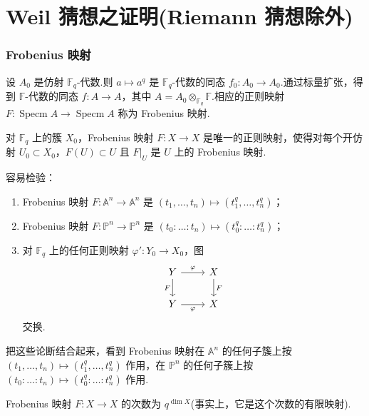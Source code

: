 ﻿%
\chapter{Weil 猜想之证明(Riemann 猜想除外)}\label{sec:27}

\subsection*{Frobenius 映射}

设 $A_0$ 是仿射 $\mathbb{F}_q$-代数.则 $a \mapsto a^{q}$ 是 $\mathbb{F}_q$-代数的同态 $f_0 \colon A_0 \to A_0$.通过标量扩张，得到 $\mathbb{F}$-代数的同态 $f \colon A \to A$，其中 $A = A_0 \otimes_{\mathbb{F}_q} \mathbb{F}$.相应的正则映射 $F \colon \operatorname{Specm} A \to \operatorname{Specm} A$ 称为 Frobenius 映射.

对 $\mathbb{F}_q$ 上的簇 $X_0$，Frobenius 映射 $F \colon X \to X$ 是唯一的正则映射，使得对每个开仿射 $U_0 \subset X_0$，$F(U) \subset U$ 且 $F|_{U}$ 是 $U$ 上的 Frobenius 映射.

容易检验：
\begin{enumerate}
  \item Frobenius 映射 $F \colon \mathbb{A}^{n} \to \mathbb{A}^{n}$ 是 $(t_1, \ldots, t_n) \mapsto (t^{q}_1, \ldots, t^{q}_n)$；
  \item Frobenius 映射 $F \colon \mathbb{P}^{n} \to \mathbb{P}^{n}$ 是 $(t_0 \colon \ldots \colon t_n) \mapsto (t^{q}_0 \colon \ldots \colon t^{q}_n)$；
  \item 对 $\mathbb{F}_q$ 上的任何正则映射 $\varphi' \colon Y_0 \to X_0$，图
  \[
  \begin{tikzcd}
  Y \arrow[r, "\varphi"] \arrow[d, "F"'] & X \arrow[d, "F"] \\
  Y \arrow[r, "\varphi"'] & X
  \end{tikzcd}
  \]
  交换.
\end{enumerate}
把这些论断结合起来，看到 Frobenius 映射在 $\mathbb{A}^{n}$ 的任何子簇上按 $(t_1, \ldots, t_n) \mapsto (t^{q}_1, \ldots, t^{q}_n)$ 作用，在 $\mathbb{P}^{n}$ 的任何子簇上按 $(t_0 \colon \ldots \colon t_n) \mapsto (t^{q}_0 \colon \ldots \colon t^{q}_n)$ 作用.

\begin{lemma}\label{lem:27.1}
Frobenius 映射 $F \colon X \to X$ 的次数为 $q^{\dim X}$(事实上，它是这个次数的有限映射).
\end{lemma}

